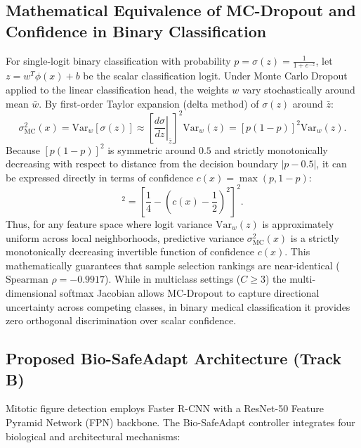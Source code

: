 \documentclass[conference]{IEEEtran}
\begin{document}
\subsection{Mathematical Equivalence of MC-Dropout and Confidence in Binary Classification}
For single-logit binary classification with probability $p = \sigma(z) = \frac{1}{1 + e^{-z}}$, let $z = w^T \phi(x) + b$ be the scalar classification logit. Under Monte Carlo Dropout applied to the linear classification head, the weights $w$ vary stochastically around mean $\bar{w}$. By first-order Taylor expansion (delta method) of $\sigma(z)$ around $\bar{z}$:
\begin{equation}
    \sigma^2_{\text{MC}}(x) = \text{Var}_w[\sigma(z)] \approx \left[\left.\frac{d\sigma}{dz}\right|_{\bar{z}}\right]^2 \text{Var}_w(z) = [p(1-p)]^2 \text{Var}_w(z).
\end{equation}
Because $[p(1-p)]^2$ is symmetric around $0.5$ and strictly monotonically decreasing with respect to distance from the decision boundary $|p - 0.5|$, it can be expressed directly in terms of confidence $c(x) = \max(p, 1-p)$:
\begin{equation}
    [p(1-p)]^2 = \left[ \frac{1}{4} - \left(c(x) - \frac{1}{2}\right)^2 \right]^2.
\end{equation}
Thus, for any feature space where logit variance $\text{Var}_w(z)$ is approximately uniform across local neighborhoods, predictive variance $\sigma^2_{\text{MC}}(x)$ is a strictly monotonically decreasing invertible function of confidence $c(x)$. This mathematically guarantees that sample selection rankings are near-identical ($\text{Spearman } \rho = -0.9917$). While in multiclass settings ($C \ge 3$) the multi-dimensional softmax Jacobian allows MC-Dropout to capture directional uncertainty across competing classes, in binary medical classification it provides zero orthogonal discrimination over scalar confidence.

\subsection{Proposed Bio-SafeAdapt Architecture (Track B)}
Mitotic figure detection employs Faster R-CNN with a ResNet-50 Feature Pyramid Network (FPN) backbone. The Bio-SafeAdapt controller integrates four biological and architectural mechanisms:
\end{document}
